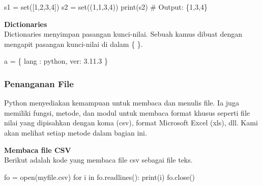 \documentclass[
  letterpaper,
  DIV=11,
  numbers=noendperiod]{scrreprt}
\newenvironment{Shaded}{\begin{snugshade}}{\end{snugshade}}
\newcommand{\BuiltInTok}[1]{\textcolor[rgb]{0.00,0.23,0.31}{#1}}
\newcommand{\CommentTok}[1]{\textcolor[rgb]{0.37,0.37,0.37}{#1}}
\newcommand{\ControlFlowTok}[1]{\textcolor[rgb]{0.00,0.23,0.31}{#1}}
\newcommand{\DecValTok}[1]{\textcolor[rgb]{0.68,0.00,0.00}{#1}}
\newcommand{\KeywordTok}[1]{\textcolor[rgb]{0.00,0.23,0.31}{#1}}
\newcommand{\NormalTok}[1]{\textcolor[rgb]{0.00,0.23,0.31}{#1}}
\newcommand{\OperatorTok}[1]{\textcolor[rgb]{0.37,0.37,0.37}{#1}}
\newcommand{\StringTok}[1]{\textcolor[rgb]{0.13,0.47,0.30}{#1}}
\begin{document}
\begin{Shaded}
\begin{Highlighting}[]
\NormalTok{s1 }\OperatorTok{=} \BuiltInTok{set}\NormalTok{([}\DecValTok{1}\NormalTok{,}\DecValTok{2}\NormalTok{,}\DecValTok{3}\NormalTok{,}\DecValTok{4}\NormalTok{])}
\NormalTok{s2 }\OperatorTok{=} \BuiltInTok{set}\NormalTok{((}\DecValTok{1}\NormalTok{,}\DecValTok{1}\NormalTok{,}\DecValTok{3}\NormalTok{,}\DecValTok{4}\NormalTok{))}
\BuiltInTok{print}\NormalTok{(s2)}
\CommentTok{\# Output: \{1,3,4\}}
\end{Highlighting}
\end{Shaded}

\textbf{Dictionaries}\\
Dictionaries menyimpan pasangan kunci-nilai. Sebuah kamus dibuat dengan
mengapit pasangan kunci-nilai di dalam \{ \}.

\begin{Shaded}
\begin{Highlighting}[]
\NormalTok{a }\OperatorTok{=}\NormalTok{ \{}
\StringTok{\textquotesingle{}lang\textquotesingle{}}\NormalTok{ : }\StringTok{\textquotesingle{}python\textquotesingle{}}\NormalTok{, }
\StringTok{\textquotesingle{}ver\textquotesingle{}}\NormalTok{: }\StringTok{\textquotesingle{}3.11.3\textquotesingle{}}
\NormalTok{\}}
\end{Highlighting}
\end{Shaded}

\hypertarget{penanganan-file}{%
\subsubsection*{Penanganan File}\label{penanganan-file}}

Python menyediakan kemampuan untuk membaca dan menulis file. Ia juga
memiliki fungsi, metode, dan modul untuk membaca format khusus seperti
file nilai yang dipisahkan dengan koma (csv), format Microsoft Excel
(xls), dll. Kami akan melihat setiap metode dalam bagian ini.

\textbf{Membaca file CSV}\\
Berikut adalah kode yang membaca file csv sebagai file teks.

\begin{Shaded}
\begin{Highlighting}[]
\NormalTok{fo }\OperatorTok{=} \BuiltInTok{open}\NormalTok{(}\StringTok{\textquotesingle{}myfile.csv\textquotesingle{}}\NormalTok{)}
\ControlFlowTok{for}\NormalTok{ i }\KeywordTok{in}\NormalTok{ fo.readlines():}
    \BuiltInTok{print}\NormalTok{(i)}
\NormalTok{fo.close()}
\end{Highlighting}
\end{Shaded}
\end{document}
